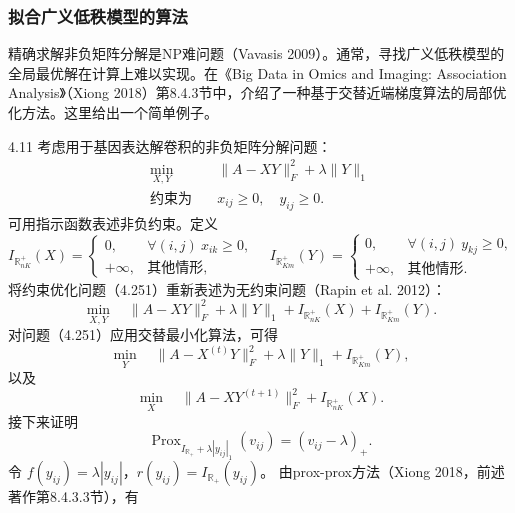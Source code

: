 \subsubsection{拟合广义低秩模型的算法}

精确求解非负矩阵分解是NP难问题（Vavasis 2009）。通常，寻找广义低秩模型的全局最优解在计算上难以实现。在《Big Data in Omics and Imaging: Association Analysis》（Xiong 2018）第8.4.3节中，介绍了一种基于交替近端梯度算法的局部优化方法。这里给出一个简单例子。

\begin{bookexample}{4.11}
考虑用于基因表达解卷积的非负矩阵分解问题：
\begin{equation}
\begin{aligned}
\min_{X,Y}\quad&\|A-XY\|_F^2+\lambda\|Y\|_1\\
\text{约束为}\quad&x_{ij}\ge0,\quad y_{ij}\ge0.
\end{aligned}\tag{4.251}
\end{equation}
可用指示函数表述非负约束。定义
\[
I_{\mathbb R_{nK}^{+}}(X)=\begin{cases}0,&\forall(i,j)\ x_{ik}\ge0,\\+\infty,&\text{其他情形},\end{cases}\quad
I_{\mathbb R_{Km}^{+}}(Y)=\begin{cases}0,&\forall(i,j)\ y_{kj}\ge0,\\+\infty,&\text{其他情形}.\end{cases}
\]
将约束优化问题（4.251）重新表述为无约束问题（Rapin et al. 2012）：
\begin{equation}
\min_{X,Y}\quad\|A-XY\|_F^2+\lambda\|Y\|_1
+I_{\mathbb R_{nK}^{+}}(X)+I_{\mathbb R_{Km}^{+}}(Y).\tag{4.252}
\end{equation}
对问题（4.251）应用交替最小化算法，可得
\begin{equation}
\min_Y\quad\|A-X^{(t)}Y\|_F^2+\lambda\|Y\|_1+I_{\mathbb R_{Km}^{+}}(Y),\tag{4.253}
\end{equation}
以及
\begin{equation}
\min_X\quad\|A-XY^{(t+1)}\|_F^2+I_{\mathbb R_{nK}^{+}}(X).\tag{4.254}
\end{equation}
接下来证明
\begin{equation}
\operatorname{Prox}_{I_{\mathbb R_+}+\lambda|y_{ij}|_1}(v_{ij})
=(v_{ij}-\lambda)_+.\tag{4.255}
\end{equation}
令 $f(y_{ij})=\lambda|y_{ij}|$，$r(y_{ij})=I_{\mathbb R_+}(y_{ij})$。
由prox-prox方法（Xiong 2018，前述著作第8.4.3.3节），有
\begin{equation}

\end{equation}
\end{bookexample}
